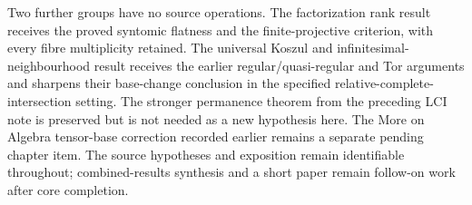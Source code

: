 Two further groups have no source operations. The factorization rank result receives the proved syntomic flatness and the finite-projective criterion, with every fibre multiplicity retained. The universal Koszul and infinitesimal-neighbourhood result receives the earlier regular/quasi-regular and Tor arguments and sharpens their base-change conclusion in the specified relative-complete-intersection setting. The stronger permanence theorem from the preceding LCI note is preserved but is not needed as a new hypothesis here. The More on Algebra tensor-base correction recorded earlier remains a separate pending chapter item. The source hypotheses and exposition remain identifiable throughout; combined-results synthesis and a short paper remain follow-on work after core completion.
